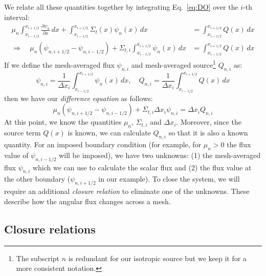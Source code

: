 \documentclass{article}
\begin{document}
We relate all these quantities together by integrating Eq.~\eqref{eq:DO} over the $i$-th interval:
\begin{align}
    \mu_n\int_{x_{i-1/2}}^{x_{i+1/2}}\frac{\partial\psi_n}{\partial x}\,dx+\int_{x_{i-1/2}}^{x_{i+1/2}}\Sigma_t(x)\psi_n(x)\,dx&=\int_{x_{i-1/2}}^{x_{i+1/2}}Q(x)\,dx \\
    \Longrightarrow\quad\mu_n\left(\psi_{n,i+1/2}-\psi_{n,i-1/2}\right)+\Sigma_{t,i}\int_{x_{i-1/2}}^{x_{i+1/2}}\psi_n(x)\,dx&=\int_{x_{i-1/2}}^{x_{i+1/2}}Q(x)\,dx
\end{align}
If we define the mesh-averaged flux $\psi_{n,i}$ and mesh-averaged source\footnote{The subscript $n$ is redundant for our isotropic source but we keep it for a more consistent notation.} $Q_{n,i}$ as:
\begin{equation}\label{SN12}
    \psi_{n,i}=\frac{1}{\Delta x_i}\int_{x_{i-1/2}}^{x_{i+1/2}}\psi_n(x)\,dx,\quad Q_{n,i}=\frac{1}{\Delta x_i}\int_{x_{i-1/2}}^{x_{i+1/2}}Q(x)\,dx
\end{equation}
then we have our \textit{difference equation} as follows:
\begin{equation}\label{SN5}
    \mu_n\left(\psi_{n,i+1/2}-\psi_{n,i-1/2}\right)+\Sigma_{t,i}\Delta x_i\psi_{n,i}=\Delta x_i Q_{n,i}
\end{equation}
At this point, we know the quantities $\mu_n,\,\Sigma_{t,i}$ and $\Delta x_i$. Moreover, since the source term $Q(x)$ is known, we can calculate $Q_{n,i}$ so that it is also a known quantity. For an imposed boundary condition (for example, for $\mu_n>0$ the flux value of $\psi_{n,i-1/2}$ will be imposed), we have two unknowns: (1) the mesh-averaged flux $\psi_{n,i}$ which we can use to calculate the scalar flux and (2) the flux value at the other boundary ($\psi_{n,i+1/2}$ in our example). To close the system, we will require an additional \textit{closure relation} to eliminate one of the unknowns. These describe how the angular flux changes across a mesh.

\subsection{Closure relations}
\end{document}

